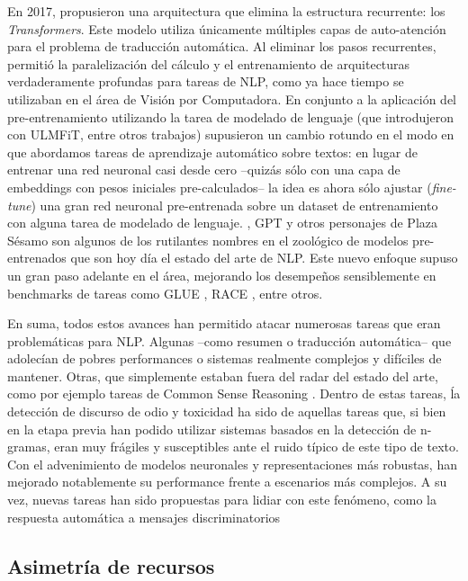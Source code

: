 En 2017, \citet{vaswani2017attention} propusieron una arquitectura que elimina la estructura recurrente: los \emph{Transformers}. Este modelo utiliza únicamente múltiples capas de auto-atención para el problema de traducción automática. Al eliminar los pasos recurrentes, permitió la paralelización del cálculo y el entrenamiento de arquitecturas verdaderamente profundas para tareas de NLP, como ya hace tiempo se utilizaban en el área de Visión por Computadora. En conjunto a la aplicación del pre-entrenamiento utilizando la tarea de modelado de lenguaje (que introdujeron \citet{howard-ruder-2018-universal} con ULMFiT, entre otros trabajos) supusieron un cambio rotundo en el modo en que abordamos tareas de aprendizaje automático sobre textos: en lugar de entrenar una red neuronal casi desde cero --quizás sólo con una capa de embeddings con pesos iniciales pre-calculados-- la idea es ahora sólo ajustar (\emph{fine-tune}) una gran red neuronal pre-entrenada sobre un dataset de entrenamiento con alguna tarea de modelado de lenguaje. \bert{}, GPT y otros personajes de Plaza Sésamo son algunos de los rutilantes nombres en el zoológico de modelos pre-entrenados que son hoy día el estado del arte de NLP. Este nuevo enfoque supuso un gran paso adelante en el área, mejorando los desempeños sensiblemente en benchmarks de tareas como GLUE \cite{wang-etal-2018-glue}, RACE \cite{lai2017race}, entre otros.

En suma, todos estos avances han permitido atacar numerosas tareas que eran problemáticas para NLP. Algunas --como resumen o traducción automática-- que adolecían de pobres performances o sistemas realmente complejos y difíciles de mantener. Otras, que simplemente estaban fuera del radar del estado del arte, como por ejemplo tareas de Common Sense Reasoning . Dentro de estas tareas, ĺa detección de discurso de odio y toxicidad ha sido de aquellas tareas que, si bien en la etapa previa han podido utilizar sistemas basados en la detección de n-gramas, eran muy frágiles y susceptibles ante el ruido típico de este tipo de texto. Con el advenimiento de modelos neuronales y representaciones más robustas, han mejorado notablemente su performance frente a escenarios más complejos. A su vez, nuevas tareas han sido propuestas para lidiar con este fenómeno, como la respuesta automática a mensajes discriminatorios   

\subsection{Asimetría de recursos}

